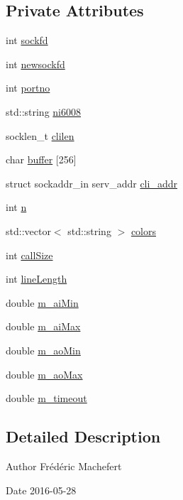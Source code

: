 \subsection*{Private Attributes}
\begin{DoxyCompactItemize}
\item 
int \hyperlink{classServer__NI6008_a79b2fe632095d34e1c6320a1ffe2d561}{sockfd}
\item 
int \hyperlink{classServer__NI6008_a37e3d77925f6c6c9d7dee4dc1c8560d6}{newsockfd}
\item 
int \hyperlink{classServer__NI6008_ae70c386215b3945d98eba610022db813}{portno}
\item 
std\+::string \hyperlink{classServer__NI6008_a9c73f187e64f7d753a8eabd9d1b6e9cd}{ni6008}
\item 
socklen\+\_\+t \hyperlink{classServer__NI6008_a7870880eba646269208e0c75de3e63bc}{clilen}
\item 
char \hyperlink{classServer__NI6008_a2ebf359e55794c1d5ce59900e90b54e6}{buffer} \mbox{[}256\mbox{]}
\item 
struct sockaddr\+\_\+in serv\+\_\+addr \hyperlink{classServer__NI6008_a8f65891da026492eba6d3642df9e0357}{cli\+\_\+addr}
\item 
int \hyperlink{classServer__NI6008_a5573d5feeef8372e2b31a54d6a5a19aa}{n}
\item 
std\+::vector$<$ std\+::string $>$ \hyperlink{classServer__NI6008_a79fecc3f96756f6a519785663bb11d07}{colors}
\item 
int \hyperlink{classServer__NI6008_a9aa5c02fb85f20452a3f8e0f9dcc33fd}{call\+Size}
\item 
int \hyperlink{classServer__NI6008_a88ff64de4d8715d849b06c2457d13e17}{line\+Length}
\item 
double \hyperlink{classServer__NI6008_af0fea276566b46d56f235bece151af78}{m\+\_\+ai\+Min}
\item 
double \hyperlink{classServer__NI6008_aa871878e7792bd5dc002f64ef7575dd4}{m\+\_\+ai\+Max}
\item 
double \hyperlink{classServer__NI6008_ad650503ceebacea17688e04065130eaa}{m\+\_\+ao\+Min}
\item 
double \hyperlink{classServer__NI6008_a228a5d51f43daaf9eaea8e77cfa3334e}{m\+\_\+ao\+Max}
\item 
double \hyperlink{classServer__NI6008_a782b89c4483096900a3c02f1b1fc2c2f}{m\+\_\+timeout}
\end{DoxyCompactItemize}


\subsection{Detailed Description}
\begin{DoxyAuthor}{Author}
Frédéric Machefert 
\end{DoxyAuthor}
\begin{DoxyDate}{Date}
2016-\/05-\/28 
\end{DoxyDate}



